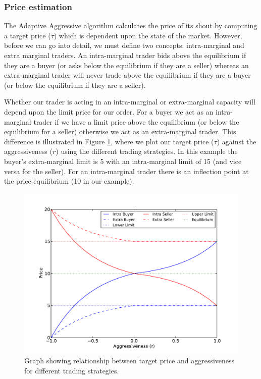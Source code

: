\documentclass[preprint]{acm_proc_article-sp} %
\begin{document}
\subsubsection{Price estimation} \label{sec:AA_price_estimation}
The Adaptive Aggressive algorithm calculates the price of its shout by
computing a target price ($\tau$) which is dependent upon
the state of the market. However, before we can go into detail, we must define
two concepts: intra-marginal and extra marginal traders. An intra-marginal trader bids above the
equilibrium if they are a buyer (or asks below the equilibrium if they are a
seller) whereas an extra-marginal trader will never trade above the
equilibrium if they are a buyer (or below the equilibrium if they are a
seller).

Whether our trader is acting in an intra-marginal or extra-marginal capacity
will depend upon the limit price for our order. For a buyer we act as an intra-marginal trader if we 
have a limit price above the equilibrium (or below the equilibrium for a seller) otherwise we act as 
an extra-marginal trader. This difference is illustrated in Figure \ref{fig:r_price}, where we plot 
our target price ($\tau$) against the aggressiveness ($r$) using the different trading strategies. In 
this example the buyer's extra-marginal limit is 5 with an intra-marginal limit of 15 (and vice versa 
for the seller). For an intra-marginal trader there is an inflection point at the price equilibrium 
(10 in our example).

\begin{figure}[H]
\centering
\includegraphics[width=\columnwidth]{graphs_and_stats/graph_r.pdf}
\caption{Graph showing relationship between target price and aggressiveness for different trading strategies.}
\label{fig:r_price}
\end{figure}
\end{document}

